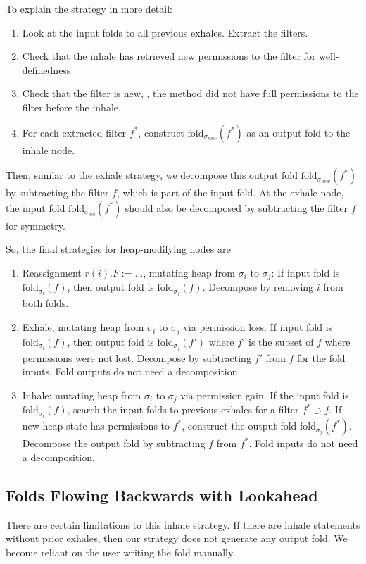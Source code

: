 \documentclass[msc,oneside]{ubcthesis}
\begin{document}
To explain the strategy in more detail:
\begin{enumerate}
    \item Look at the input folds to all previous exhales. Extract the filters.
    \item Check that the inhale has retrieved new permissions to the filter for well-definedness. 
    \item Check that the filter is new, \ie, the method did not have full permissions to the filter before the inhale. 
    \item For each extracted filter $f^*$, construct $\textrm{fold}_{\sigma_{new}}(f^*)$ as an output fold to the inhale node.
\end{enumerate}

Then, similar to the exhale strategy, we decompose this output fold $\textrm{fold}_{\sigma_{new}}(f^*)$ by subtracting the filter $f$, which is part of the input fold. At the exhale node, the input fold $\textrm{fold}_{\sigma_{old}}(f^*)$ should also be decomposed by subtracting the filter $f$ for symmetry. 

So, the final strategies for heap-modifying nodes are
\begin{enumerate}
    \item Reassignment $r(i).F := ...$, mutating heap from $\sigma_i$ to $\sigma_j$: 
    If input fold is $\textrm{fold}_{\sigma_i}(f)$, then output fold is $\textrm{fold}_{\sigma_j}(f)$. 
    Decompose by removing $i$ from both folds.
    \item Exhale, mutating heap from $\sigma_i$ to $\sigma_j$ via permission loss. If input fold is $\textrm{fold}_{\sigma_i}(f)$, then output fold is $\textrm{fold}_{\sigma_j}(f')$ where $f'$ is the subset of $f$ where permissions were not lost. Decompose by subtracting $f'$ from $f$ for the fold inputs. Fold outputs do not need a decomposition.
    \item Inhale: mutating heap from $\sigma_i$ to $\sigma_j$ via permission gain. If the input fold is $\textrm{fold}_{\sigma_i}(f)$, search the input folds to previous exhales for a filter $f^* \supset f$. If new heap state has permissions to $f^*$, construct the output fold $\textrm{fold}_{\sigma_j}(f^*)$. Decompose the output fold by subtracting $f$ from $f^*$. Fold inputs do not need a decomposition.
\end{enumerate}

\subsection{Folds Flowing Backwards with Lookahead}
There are certain limitations to this inhale strategy. If there are inhale statements without prior exhales, then our strategy does not generate any output fold. We become reliant on the user writing the fold manually. 
\end{document}

